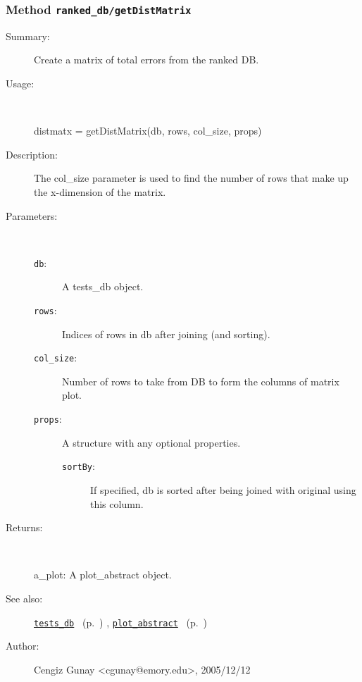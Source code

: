 \subsubsection[Method \texttt{getDistMatrix}]{Method \texttt{ranked\_db/getDistMatrix}}%
%
\label{ref_ranked_db__getDistMatrix}%
\hypertarget{ref_ranked_db__getDistMatrix}{}%
\begin{description}
\item[Summary:]Create a matrix of total errors from the ranked DB.
%
\item[Usage:]~%
\begin{lyxcode}%
distmatx = getDistMatrix(db, rows, col\_size, props)
%
\end{lyxcode}%
%
\item[Description:]%
The col\_size parameter is used to find the number of rows that make up the 
 x-dimension of the matrix.
\item[Parameters:]~
\begin{description}%
\item[\texttt{db}:]
 A tests\_db object.
\item[\texttt{rows}:]
 Indices of rows in db after joining (and sorting).
\item[\texttt{col\_size}:]
 Number of rows to take from DB to form the columns of matrix plot.
\item[\texttt{props}:]
 A structure with any optional properties.
\begin{description}%
\item[\texttt{sortBy}:]
 If specified, db is sorted after being joined with original using this column.
\end{description}%
\end{description}%
%
\item[Returns:
]~

	a\_plot: A plot\_abstract object.
%
%
\item[See also:]%
\hyperlink{ref_tests_db}{\texttt{tests\_db}}%
\ (p.~\pageref{ref_tests_db})%
%
, \hyperlink{ref_plot_abstract}{\texttt{plot\_abstract}}%
\ (p.~\pageref{ref_plot_abstract})%
%
%
\item[Author:]%
Cengiz Gunay <cgunay@emory.edu>, 2005/12/12
%
\end{description}
\methodline%
